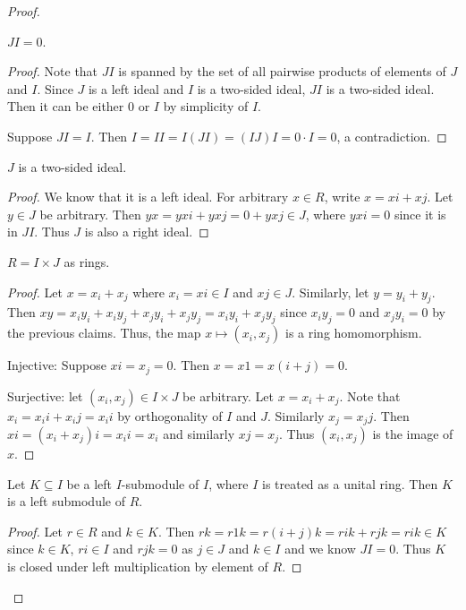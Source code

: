 \begin{proof}
  \begin{claim}
    $J I = 0$.
  \end{claim}
  \begin{proof}
    \leanok
    Note that $JI$ is spanned by the set of all pairwise products of elements of $J$ and $I$. Since $J$ is a left ideal and $I$ is a two-sided ideal, $JI$ is a two-sided ideal. Then it can be either $0$ or $I$ by simplicity of $I$.

    Suppose $JI = I$. Then $I = I I = I (J I) = (I J) I = 0 \cdot I = 0$, a contradiction.
  \end{proof}

  \begin{claim}
    $J$ is a two-sided ideal.
  \end{claim}
  \begin{proof}
    \leanok
    We know that it is a left ideal. For arbitrary $x \in R$, write $x = x i + x j$. Let $y \in J$ be arbitrary. Then $y x = y x i + y x j = 0 + y x j \in J$, where $y x i = 0$ since it is in $J I$. Thus $J$ is also a right ideal.
  \end{proof}

  \begin{claim}
    $ R = I \times J$ as rings.
  \end{claim}
  \begin{proof}
    \leanok
    Let $x = x_i + x_j$ where $x_i = x i \in I$ and $x j \in J$. Similarly, let $y = y_i + y_j$. Then $x y = x_i y_i + x_i y_j + x_j y_i + x_j y_j = x_i y_i + x_j y_j$ since $x_i y_j = 0$ and $x_j y_i = 0$ by the previous claims. Thus, the map $x \mapsto (x_i, x_j)$ is a ring homomorphism.

    Injective: Suppose $x i = x_j = 0$. Then $x = x 1 = x (i + j) = 0$.

    Surjective: let $(x_i, x_j)\in I \times J$ be arbitrary. Let $x = x_i + x_j$. Note that $x_i = x_i i + x_i j = x_i i$ by orthogonality of $I$ and $J$. Similarly $x_j = x_j j$. Then $x i = (x_i + x_j) i = x_i i = x_i$ and similarly $x j = x_j$. Thus $(x_i, x_j)$ is the image of $x$.
  \end{proof}

  \begin{claim}
    Let $K \subseteq I$ be a left $I$-submodule of $I$, where $I$ is treated as a unital ring. Then $K$ is a left submodule of $R$.
  \end{claim}
  \begin{proof}
    \leanok
    Let $r \in R$ and $k \in K$. Then $r k = r 1 k = r (i + j) k = r i k + r j k = r i k \in K$ since $k \in K$, $r i \in I$ and $r j k = 0$ as $j \in J$ and $k \in I$ and we know $J I = 0$. Thus $K$ is closed under left multiplication by element of $R$.
  \end{proof}


\end{proof}
